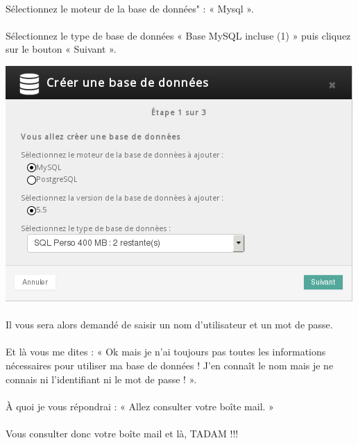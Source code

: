 \documentclass[10pt,a4paper]{article}
\begin{document}
\paragraph{}Sélectionnez le moteur de la base de données" : « Mysql ». \paragraph{}Sélectionnez le type de base de données « Base MySQL incluse (1) » puis cliquez sur le bouton « Suivant ».
\begin{center}
\includegraphics[scale=0.4]{img/0294.png}
\end{center}
\paragraph{}Il vous sera alors demandé de saisir un nom d'utilisateur et un mot de passe.
\newpage
\paragraph{}Et là vous me dites : « Ok mais je n'ai toujours pas toutes les informations nécessaires pour utiliser ma base de données ! J'en connaît le nom mais je ne connais ni l'identifiant ni le mot de passe ! ».
\paragraph{}À quoi je vous répondrai : « Allez consulter votre boîte mail. »
\paragraph{}Vous consulter donc votre boîte mail et là, TADAM !!!
\end{document}
